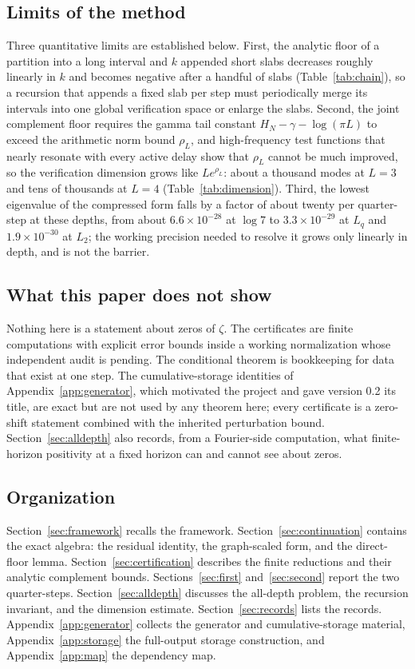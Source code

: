 \documentclass[11pt]{article}
\numberwithin{equation}{section}
\theoremstyle{definition}
\theoremstyle{remark}
\newcommand{\Lq}{L_q}
\newcommand{\Ltwo}{L_2}
\begin{document}
\subsection{Limits of the method}
Three quantitative limits are established below. First, the analytic floor of a partition into a long interval and $k$ appended short slabs decreases roughly linearly in $k$ and becomes negative after a handful of slabs (Table~\ref{tab:chain}), so a recursion that appends a fixed slab per step must periodically merge its intervals into one global verification space or enlarge the slabs. Second, the joint complement floor requires the gamma tail constant $H_N-\gamma-\log(\pi L)$ to exceed the arithmetic norm bound $\rho_L$, and high-frequency test functions that nearly resonate with every active delay show that $\rho_L$ cannot be much improved, so the verification dimension grows like $Le^{\rho_L}$: about a thousand modes at $L=3$ and tens of thousands at $L=4$ (Table~\ref{tab:dimension}). Third, the lowest eigenvalue of the compressed form falls by a factor of about twenty per quarter-step at these depths, from about $6.6\times10^{-28}$ at $\log7$ to $3.3\times10^{-29}$ at $\Lq$ and $1.9\times10^{-30}$ at $\Ltwo$; the working precision needed to resolve it grows only linearly in depth, and is not the barrier.

\subsection{What this paper does not show}
Nothing here is a statement about zeros of $\zeta$. The certificates are finite computations with explicit error bounds inside a working normalization whose independent audit is pending. The conditional theorem is bookkeeping for data that exist at one step. The cumulative-storage identities of Appendix~\ref{app:generator}, which motivated the project and gave version 0.2 its title, are exact but are not used by any theorem here; every certificate is a zero-shift statement combined with the inherited perturbation bound. Section~\ref{sec:alldepth} also records, from a Fourier-side computation, what finite-horizon positivity at a fixed horizon can and cannot see about zeros.

\subsection{Organization}
Section~\ref{sec:framework} recalls the framework. Section~\ref{sec:continuation} contains the exact algebra: the residual identity, the graph-scaled form, and the direct-floor lemma. Section~\ref{sec:certification} describes the finite reductions and their analytic complement bounds. Sections~\ref{sec:first} and~\ref{sec:second} report the two quarter-steps. Section~\ref{sec:alldepth} discusses the all-depth problem, the recursion invariant, and the dimension estimate. Section~\ref{sec:records} lists the records. Appendix~\ref{app:generator} collects the generator and cumulative-storage material, Appendix~\ref{app:storage} the full-output storage construction, and Appendix~\ref{app:map} the dependency map.
\end{document}
